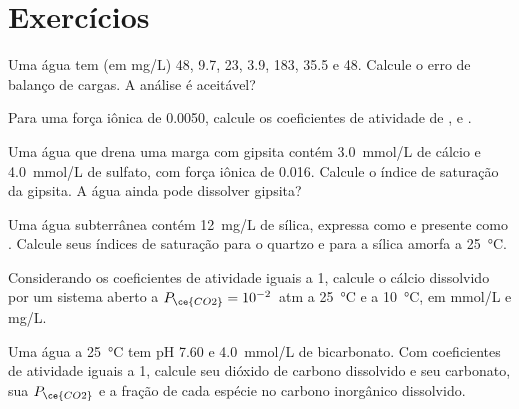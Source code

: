 \section{Exercícios}

\begin{exercise}[$\star$]\label{exo:b3:water-rock-interaction:1}
Uma água tem (em \unit{mg/L})  48,  9.7,  23,  3.9,
 183,  35.5 e  48. Calcule o erro de balanço de
cargas. A análise é aceitável?
\end{exercise}

\begin{exercise}[$\star$]\label{exo:b3:water-rock-interaction:2}
Para uma força iônica de 0.0050, calcule os coeficientes de atividade de
,  e .
\end{exercise}

\begin{exercise}[$\star$]\label{exo:b3:water-rock-interaction:3}
Uma água que drena uma marga com gipsita contém \qty{3.0}{mmol/L} de cálcio e
\qty{4.0}{mmol/L} de sulfato, com força iônica de 0.016. Calcule o índice de
saturação da gipsita. A água ainda pode dissolver gipsita?
\end{exercise}

\begin{exercise}[$\star$]\label{exo:b3:water-rock-interaction:4}
Uma água subterrânea contém \qty{12}{mg/L} de sílica, expressa como  e
presente como . Calcule seus índices de saturação para o quartzo e
para a sílica amorfa a \qty{25}{\celsius}.
\end{exercise}

\begin{exercise}[$\star\star$]\label{exo:b3:water-rock-interaction:5}
Considerando os coeficientes de atividade iguais a 1, calcule o cálcio dissolvido
por um sistema aberto a $P_{\ce{CO2}} = 10^{-2}$~atm a \qty{25}{\celsius} e a
\qty{10}{\celsius}, em \unit{mmol/L} e \unit{mg/L}.
\end{exercise}

\begin{exercise}[$\star\star$]\label{exo:b3:water-rock-interaction:6}
Uma água a \qty{25}{\celsius} tem pH 7.60 e \qty{4.0}{mmol/L} de bicarbonato.
Com coeficientes de atividade iguais a 1, calcule seu dióxido de carbono dissolvido
e seu carbonato, sua $P_{\ce{CO2}}$ e a fração de cada espécie no
carbono inorgânico dissolvido.
\end{exercise}

